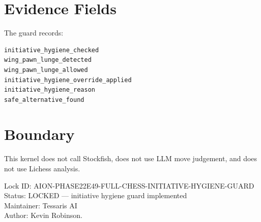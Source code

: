 \documentclass[11pt,a4paper]{article}
\begin{document}
\section{Evidence Fields}

The guard records:

\begin{verbatim}
initiative_hygiene_checked
wing_pawn_lunge_detected
wing_pawn_lunge_allowed
initiative_hygiene_override_applied
initiative_hygiene_reason
safe_alternative_found
\end{verbatim}

\section{Boundary}

This kernel does not call Stockfish, does not use LLM move judgement, and does not use Lichess analysis.

\bigskip

\noindent
Lock ID: AION-PHASE22E49-FULL-CHESS-INITIATIVE-HYGIENE-GUARD\\
Status: LOCKED --- initiative hygiene guard implemented\\
Maintainer: Tessaris AI\\
Author: Kevin Robinson.
\end{document}
